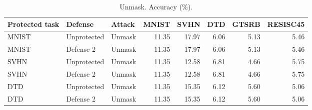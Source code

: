 \begin{table}[t]
\centering\small
\caption{Unmask. Accuracy (\%).}
\begin{tabular}{lllrrrrr}
\toprule
Protected task & Defense & Attack & MNIST & SVHN & DTD & GTSRB & RESISC45 \\
\midrule
MNIST & Unprotected & Unmask & 11.35 & 17.97 & 6.06 & 5.13 & 5.46 \\
MNIST & Defense 2 & Unmask & 11.35 & 17.97 & 6.06 & 5.13 & 5.46 \\
SVHN & Unprotected & Unmask & 11.35 & 12.58 & 6.81 & 4.66 & 5.75 \\
SVHN & Defense 2 & Unmask & 11.35 & 12.58 & 6.81 & 4.66 & 5.75 \\
DTD & Unprotected & Unmask & 11.35 & 15.35 & 6.12 & 5.60 & 5.06 \\
DTD & Defense 2 & Unmask & 11.35 & 15.35 & 6.12 & 5.60 & 5.06 \\
\bottomrule
\end{tabular}
\end{table}
